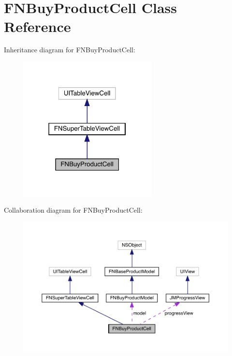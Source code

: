\hypertarget{interface_f_n_buy_product_cell}{}\section{F\+N\+Buy\+Product\+Cell Class Reference}
\label{interface_f_n_buy_product_cell}


Inheritance diagram for F\+N\+Buy\+Product\+Cell\+:\nopagebreak
\begin{figure}[H]
\begin{center}
\leavevmode
\includegraphics[width=199pt]{interface_f_n_buy_product_cell__inherit__graph}
\end{center}
\end{figure}


Collaboration diagram for F\+N\+Buy\+Product\+Cell\+:\nopagebreak
\begin{figure}[H]
\begin{center}
\leavevmode
\includegraphics[width=350pt]{interface_f_n_buy_product_cell__coll__graph}
\end{center}
\end{figure}
